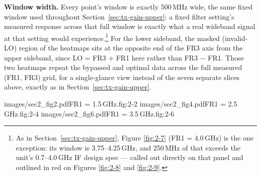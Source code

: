 \textbf{Window width.} Every point's window is exactly 500\,MHz wide, the same fixed window used throughout
Section~\ref{sec:tx-gain-upper}: a fixed filter setting's measured response across that full window is exactly
what a real wideband signal at that setting would experience.\footnote{As in Section~\ref{sec:tx-gain-upper},
Figure \ref{fig:2-7} (FR1 = 4.0\,GHz) is the one exception: its window is 3.75--4.25\,GHz, and 250\,MHz of that
exceeds the unit's 0.7--4.0\,GHz IF design spec --- called out directly on that panel and outlined in red on
Figures \ref{fig:2-8} and \ref{fig:2-9}.} For the lower sideband, the masked (invalid-LO) region of the heatmaps
sits at the opposite end of the FR3 axis from the upper sideband, since LO = FR3 + FR1 here rather than
FR3 − FR1. Those two heatmaps repeat the bypassed and optimal data across the full measured (FR1, FR3) grid,
for a single-glance view instead of the seven separate slices above, exactly as in Section~\ref{sec:tx-gain-upper}.

%
        {images/sec2_fig2.pdf}{FR1 = 1.5\,GHz.}{fig:2-2}
%
        {images/sec2_fig4.pdf}{FR1 = 2.5\,GHz.}{fig:2-4}
%
        {images/sec2_fig6.pdf}{FR1 = 3.5\,GHz.}{fig:2-6}

